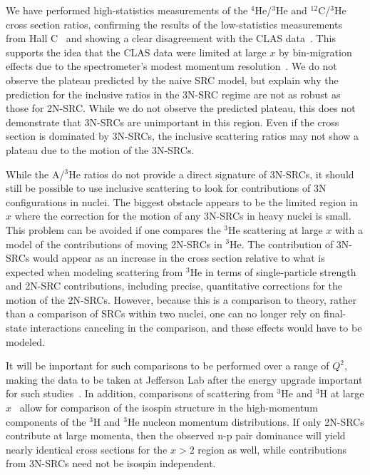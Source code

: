\documentclass[aps,prl,superscriptaddress,showpacs,twocolumn,floatfix,amsmath,amssymb]{revtex4-1}
\begin{document}
We have performed high-statistics measurements of the $^4$He/$^3$He and $^{12}$C/$^3$He cross section
ratios, confirming the results of the low-statistics measurements from Hall C~\cite{fomin2012} and showing
a clear disagreement with the CLAS data~\cite{PhysRevLett.96.082501}. This supports the idea that the CLAS
data were limited at large $x$ by bin-migration effects due to the spectrometer's modest momentum
resolution~\cite{Higinbotham:2014xna}. We do not observe the plateau predicted by the naive SRC model, but
explain why the prediction for the inclusive ratios in the 3N-SRC regime are not as robust as those for
2N-SRC. While we do not observe the predicted plateau, this does not demonstrate that 3N-SRCs are
unimportant in this region. Even if the cross section is dominated by 3N-SRCs, the inclusive scattering
ratios may not show a plateau due to the motion of the 3N-SRCs.

While the A/$^3$He ratios do not provide a direct signature of 3N-SRCs, it should still be possible to use
inclusive scattering to look for contributions of 3N configurations in nuclei. The biggest obstacle appears
to be the limited region in $x$ where the correction for the motion of any 3N-SRCs in heavy nuclei is small.
This problem can be avoided if one compares the $^3$He scattering at large $x$ with a model of the
contributions of moving 2N-SRCs in $^3$He. The contribution of 3N-SRCs would appear as an increase in the
cross section relative to what is expected when modeling scattering from $^3$He in terms of single-particle
strength and 2N-SRC contributions, including precise, quantitative corrections for the motion of the
2N-SRCs. However, because this is a comparison to theory, rather than a comparison of SRCs within two
nuclei, one can no longer rely on final-state interactions canceling in the comparison, and these effects
would have to be modeled.

It will be important for such comparisons to be performed over a range of $Q^2$, making the data to be taken
at Jefferson Lab after the energy upgrade important for such studies~\cite{e1206105}. In addition,
comparisons of scattering from $^3$He and $^3$H at large $x$~\cite{e1211112} allow for comparison of the
isospin structure in the high-momentum components of the $^3$H and $^3$He nucleon momentum distributions. If
only 2N-SRCs contribute at large momenta, then the observed n-p pair dominance will yield nearly identical
cross sections for the $x>2$ region as well, while contributions from 3N-SRCs need not be isospin independent.
\end{document}
